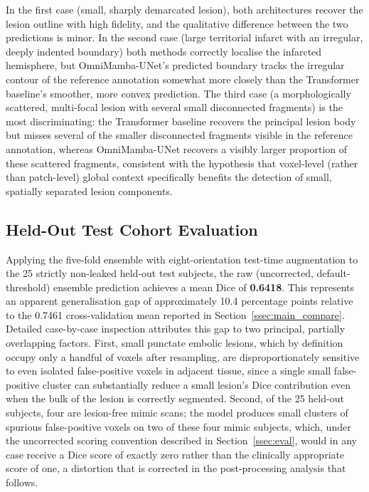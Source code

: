 \documentclass[pdflatex,sn-mathphys-num]{sn-jnl}
\begin{document}
In the first case (small, sharply demarcated lesion), both
architectures recover the lesion outline with high fidelity, and the
qualitative difference between the two predictions is minor. In the
second case (large territorial infarct with an irregular, deeply
indented boundary) both methods correctly localise the infarcted
hemisphere, but OmniMamba-UNet's predicted boundary tracks the
irregular contour of the reference annotation somewhat more closely
than the Transformer baseline's smoother, more convex prediction. The
third case (a morphologically scattered, multi-focal lesion with
several small disconnected fragments) is the most discriminating: the
Transformer baseline recovers the principal lesion body but misses
several of the smaller disconnected fragments visible in the
reference annotation, whereas OmniMamba-UNet recovers a visibly larger
proportion of these scattered fragments, consistent with the
hypothesis that voxel-level (rather than patch-level) global context
specifically benefits the detection of small, spatially separated
lesion components.

\subsection{Held-Out Test Cohort Evaluation}\label{ssec:test_eval}
Applying the five-fold ensemble with eight-orientation test-time
augmentation to the 25 strictly non-leaked held-out test subjects, the
raw (uncorrected, default-threshold) ensemble prediction achieves a
mean Dice of \textbf{0.6418}. This represents an apparent
generalisation gap of approximately 10.4 percentage points relative to
the 0.7461 cross-validation mean reported in
Section~\ref{ssec:main_compare}. Detailed case-by-case inspection
attributes this gap to two principal, partially overlapping factors.
First, small punctate embolic lesions, which by definition occupy only
a handful of voxels after resampling, are disproportionately sensitive
to even isolated false-positive voxels in adjacent tissue, since a
single small false-positive cluster can substantially reduce a small
lesion's Dice contribution even when the bulk of the lesion is
correctly segmented. Second, of the 25 held-out subjects, four are
lesion-free mimic scans; the model produces small clusters of
spurious false-positive voxels on two of these four mimic subjects,
which, under the uncorrected scoring convention described in
Section~\ref{ssec:eval}, would in any case receive a Dice score of
exactly zero rather than the clinically appropriate score of one, a
distortion that is corrected in the post-processing analysis that
follows.
\end{document}
